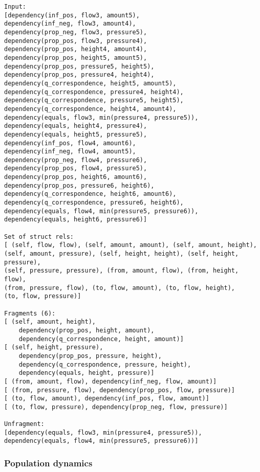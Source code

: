 \documentclass{article} %
\begin{document}
\begin{verbatim}
Input:
[dependency(inf_pos, flow3, amount5), 
dependency(inf_neg, flow3, amount4), 
dependency(prop_neg, flow3, pressure5), 
dependency(prop_pos, flow3, pressure4), 
dependency(prop_pos, height4, amount4), 
dependency(prop_pos, height5, amount5), 
dependency(prop_pos, pressure5, height5), 
dependency(prop_pos, pressure4, height4), 
dependency(q_correspondence, height5, amount5), 
dependency(q_correspondence, pressure4, height4), 
dependency(q_correspondence, pressure5, height5), 
dependency(q_correspondence, height4, amount4), 
dependency(equals, flow3, min(pressure4, pressure5)), 
dependency(equals, height4, pressure4), 
dependency(equals, height5, pressure5), 
dependency(inf_pos, flow4, amount6), 
dependency(inf_neg, flow4, amount5), 
dependency(prop_neg, flow4, pressure6), 
dependency(prop_pos, flow4, pressure5), 
dependency(prop_pos, height6, amount6), 
dependency(prop_pos, pressure6, height6), 
dependency(q_correspondence, height6, amount6), 
dependency(q_correspondence, pressure6, height6), 
dependency(equals, flow4, min(pressure5, pressure6)), 
dependency(equals, height6, pressure6)]

Set of struct rels: 
[ (self, flow, flow), (self, amount, amount), (self, amount, height), 
(self, amount, pressure), (self, height, height), (self, height, pressure),
(self, pressure, pressure), (from, amount, flow), (from, height, flow), 
(from, pressure, flow), (to, flow, amount), (to, flow, height), 
(to, flow, pressure)]

Fragments (6):
[ (self, amount, height), 
	dependency(prop_pos, height, amount), 
	dependency(q_correspondence, height, amount)]
[ (self, height, pressure), 
	dependency(prop_pos, pressure, height), 
	dependency(q_correspondence, pressure, height), 
	dependency(equals, height, pressure)]
[ (from, amount, flow), dependency(inf_neg, flow, amount)]
[ (from, pressure, flow), dependency(prop_pos, flow, pressure)]
[ (to, flow, amount), dependency(inf_pos, flow, amount)]
[ (to, flow, pressure), dependency(prop_neg, flow, pressure)]

Unfragment:
[dependency(equals, flow3, min(pressure4, pressure5)), 
dependency(equals, flow4, min(pressure5, pressure6))]
\end{verbatim}


\subsubsection{Population dynamics}
\end{document}
